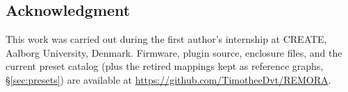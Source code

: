 \documentclass[a4paper,10pt,oneside]{article}
\begin{document}
\begin{sloppy}
\section{Acknowledgment}
\label{sec:ack}

This work was carried out during the first author's internship at CREATE, Aalborg
University, Denmark. Firmware, plugin source, enclosure files, and the current preset
catalog (plus the retired mappings kept as reference graphs, \S\ref{sec:presets}) are
available at \url{https://github.com/TimotheeDvt/REMORA}.

\balance



\end{sloppy}
\end{document}

